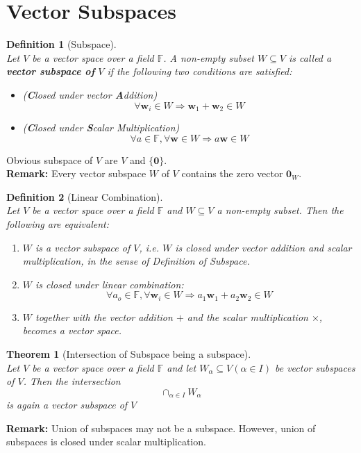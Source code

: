\documentclass[12pt]{article}
\newtheorem{definition}{Definition}[section]
\newtheorem{theorem}{Theorem}[section]
\theoremstyle{definition}
\begin{document}
\section{Vector Subspaces}
\begin{definition}[Subspace]
\hfill\\
\normalfont Let $V$ be a vector space over a field $\mathbb{F}$. A non-empty subset $W\subseteq V$ is called a \textbf{vector subspace of} $V$ if the following two conditions are satisfied:
\begin{itemize}
\item[(CA)] (\textbf{C}losed under vector \textbf{A}ddition) 
\[
\forall \mathbf{w}_i\in W\Rightarrow \mathbf{w}_1+\mathbf{w}_2\in W
\]
\item[(CS)] (\textbf{C}losed under \textbf{S}calar Multiplication)
\[
\forall a\in \mathbb{F}, \forall\mathbf{w}\in W\Rightarrow a\mathbf{w}\in W
\] 
\end{itemize}
\end{definition}
Obvious subspace of $V$ are $V$ and $\{\mathbf{0}\}$.\\
\textbf{Remark:} Every vector subspace $W$ of $V$ contains the zero vector $\mathbf{0}_W$.
\begin{definition}[Linear Combination]
\hfill\\\normalfont Let $V$ be a vector space over a field $\mathbb{F}$ and $W\subseteq V$ a non-empty subset. Then the following are equivalent:
\begin{enumerate}[label=(\roman*)]
\item $W$ is a vector subspace of $V$, i.e. $W$ is closed under vector addition and scalar multiplication, in the sense of Definition of Subspace.
\item $W$ is closed under linear combination:
\[
\forall a_o\in\mathbb{F}, \forall\mathbf{w}_i\in W\Rightarrow a_1\mathbf{w}_1+a_2\mathbf{w}_2\in W
\]
\item $W$ together with the vector addition $+$ and the scalar multiplication $\times$, becomes a vector space.
\end{enumerate}
\end{definition}
\begin{theorem}[Intersection of Subspace being a subspace]
\hfill\\\normalfont Let $V$ be a vector space over a field $\mathbb{F}$ and let $W_\alpha\subseteq V(\alpha\in I)$ be vector subspaces of $V$. Then the intersection
\[
\cap_{\alpha\in I}W_\alpha
\]
is again a vector subspace of $V$
\end{theorem}
\textbf{Remark:} Union of subspaces may not be a subspace. However, union of subspaces is closed under scalar multiplication.\\
\clearpage
\end{document}
